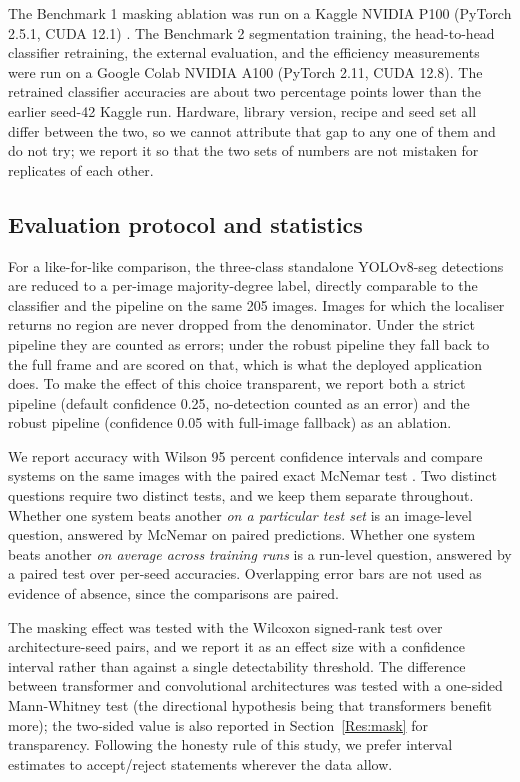 \documentclass{melba}
\begin{document}
The Benchmark 1 masking ablation was run on a Kaggle NVIDIA P100 (PyTorch 2.5.1, CUDA 12.1) \citep{pytorch}. The Benchmark 2 segmentation training, the head-to-head classifier retraining, the external evaluation, and the efficiency measurements were run on a Google Colab NVIDIA A100 (PyTorch 2.11, CUDA 12.8). The retrained classifier accuracies are about two percentage points lower than the earlier seed-42 Kaggle run. Hardware, library version, recipe and seed set all differ between the two, so we cannot attribute that gap to any one of them and do not try; we report it so that the two sets of numbers are not mistaken for replicates of each other.

\subsection{Evaluation protocol and statistics}
\label{Mat:eval}
For a like-for-like comparison, the three-class standalone YOLOv8-seg detections are reduced to a per-image majority-degree label, directly comparable to the classifier and the pipeline on the same 205 images. Images for which the localiser returns no region are never dropped from the denominator. Under the strict pipeline they are counted as errors; under the robust pipeline they fall back to the full frame and are scored on that, which is what the deployed application does. To make the effect of this choice transparent, we report both a strict pipeline (default confidence 0.25, no-detection counted as an error) and the robust pipeline (confidence 0.05 with full-image fallback) as an ablation.

We report accuracy with Wilson 95 percent confidence intervals \citep{wilson} and compare systems on the same images with the paired exact McNemar test \citep{mcnemar}. Two distinct questions require two distinct tests, and we keep them separate throughout. Whether one system beats another \emph{on a particular test set} is an image-level question, answered by McNemar on paired predictions. Whether one system beats another \emph{on average across training runs} is a run-level question, answered by a paired test over per-seed accuracies. Overlapping error bars are not used as evidence of absence, since the comparisons are paired.

The masking effect was tested with the Wilcoxon signed-rank test over architecture-seed pairs, and we report it as an effect size with a confidence interval rather than against a single detectability threshold. The difference between transformer and convolutional architectures was tested with a one-sided Mann-Whitney test (the directional hypothesis being that transformers benefit more); the two-sided value is also reported in Section~\ref{Res:mask} for transparency. Following the honesty rule of this study, we prefer interval estimates to accept/reject statements wherever the data allow.
\end{document}
